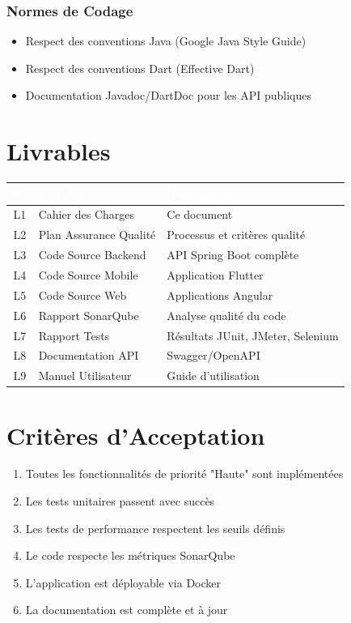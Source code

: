 \documentclass[12pt,a4paper]{report}
\begin{document}
\subsubsection{Normes de Codage}
\begin{itemize}
    \item Respect des conventions Java (Google Java Style Guide)
    \item Respect des conventions Dart (Effective Dart)
    \item Documentation Javadoc/DartDoc pour les API publiques
\end{itemize}

\section{Livrables}

\begin{tabularx}{\textwidth}{|c|l|X|}
    \hline
    \rowcolor{emsiblue}\textcolor{white}{\textbf{N°}} & \textcolor{white}{\textbf{Livrable}} & \textcolor{white}{\textbf{Description}} \\
    \hline
    L1 & Cahier des Charges & Ce document \\
    \hline
    L2 & Plan Assurance Qualité & Processus et critères qualité\\
    \hline
    L3 & Code Source Backend & API Spring Boot complète \\
    \hline
    L4 & Code Source Mobile & Application Flutter\\
    \hline
    L5 & Code Source Web & Applications Angular \\
    \hline
    L6 & Rapport SonarQube & Analyse qualité du code \\
    \hline
    L7 & Rapport Tests & Résultats JUnit, JMeter, Selenium \\
    \hline
    L8 & Documentation API & Swagger/OpenAPI \\
    \hline
    L9 & Manuel Utilisateur & Guide d'utilisation \\
    \hline
\end{tabularx}

\section{Critères d'Acceptation}

\begin{enumerate}
    \item Toutes les fonctionnalités de priorité "Haute" sont implémentées
    \item Les tests unitaires passent avec succès
    \item Les tests de performance respectent les seuils définis
    \item Le code respecte les métriques SonarQube
    \item L'application est déployable via Docker
    \item La documentation est complète et à jour
\end{enumerate}
\end{document}
